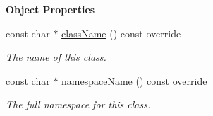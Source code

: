 \begin{Indent}\textbf{ Object Properties}\par
\begin{DoxyCompactItemize}
\item 
const char $\ast$ \mbox{\hyperlink{classrev_1_1_light_cluster_grid_ae6997baead0a18e803d84251788bd5cf}{class\+Name}} () const override
\begin{DoxyCompactList}\small\item\em The name of this class. \end{DoxyCompactList}\item 
const char $\ast$ \mbox{\hyperlink{classrev_1_1_light_cluster_grid_a834907de0608ed380466df59dc981ff1}{namespace\+Name}} () const override
\begin{DoxyCompactList}\small\item\em The full namespace for this class. \end{DoxyCompactList}\end{DoxyCompactItemize}
\end{Indent}
